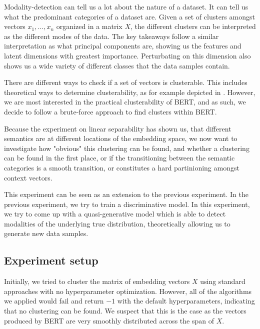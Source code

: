 \documentclass[a4paper,12pt,twoside,openright]{report}
\begin{document}
Modality-detection can tell us a lot about the nature of a dataset.
It can tell us what the predominant categories of a dataset are.
Given a set of clusters amongst vectors $x_1, \ldots, x_n$ organized in a matrix $X$, the different clusters can be interpreted as the different modes of the data.
The key takeaways follow a similar interpretation as what principal components are, showing us the features and latent dimensions with greatest importance.
Perturbating on this dimension also shows us a wide variety of different classes that the data samples contain.

There are different ways to check if a set of vectors is clusterable. This includes theoretical ways to determine clusterability, as for example depicted in \cite{ackerman09, mccarthy16}. 
However, we are most interested in the practical clusterability of BERT, and as such, we decide to follow a brute-force approach to find clusters within BERT.

Because the experiment on linear separability has shown us, that different semantics are at different locations of the embedding space, we now want to investigate how "obvious" this clustering can be found, and whether a clustering can be found in the first place, or if the transitioning between the semantic categories is a smooth transition, or constitutes a hard partinioning amongst context vectors.

This experiment can be seen as an extension to the previous experiment.
In the previous experiment, we try to train a discriminative model.
In this experiment, we try to come up with a quasi-generative model which is able to detect modalities of the underlying true distribution, theoretically allowing us to generate new data samples.

\subsection{Experiment setup}

Initially, we tried to cluster the matrix of embedding vectors $X$ using standard approaches with no hyperparameter optimization. 
However, all of the algorithms we applied would fail and return $-1$ with the default hyperparameters, indicating that no clustering can be found.
We suspect that this is the case as the vectors produced by BERT are very smoothly distributed across the span of $X$. \\
\end{document}
